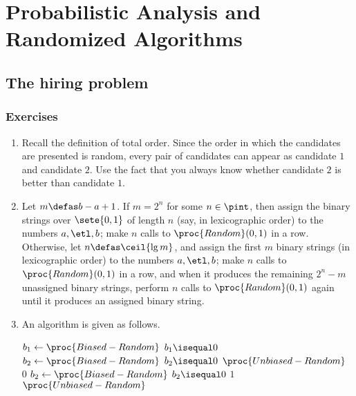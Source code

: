 \setcounter{chapter}{4}
\chapter{Probabilistic Analysis and Randomized Algorithms}
\section{The hiring problem}
\subsection*{Exercises}
\begin{enumerate}[\thesection-1]
%
\item Recall the definition of total order. Since the order in which the candidates are presented is random, every pair of candidates can appear as candidate $1$ and candidate $2$. Use the fact that you always know whether candidate $2$ is better than candidate $1$.
%
\item Let $m \defas b - a + 1$. If $m = 2^n$ for some $n \in \pint$, then assign the binary strings over $\sete{0, 1}$ of length $n$ (say, in lexicographic order) to the numbers $a, \etl, b$; make $n$ calls to $\proc{Random}(0, 1)$ in a row. Otherwise, let $n \defas \ceil{\lg m}$, and assign the first $m$ binary strings (in lexicographic order) to the numbers $a, \etl, b$; make $n$ calls to $\proc{Random}(0, 1)$ in a row, and when it produces the remaining $2^n - m$ unassigned binary strings, perform $n$ calls to $\proc{Random}(0, 1)$ again until it produces an assigned binary string.
%
\item An algorithm is given as follows.
\begin{codebox}
\li $b_1 \gets \proc{Biased-Random}$
\li \If $b_1 \isequal 0$
\li \Then
          $b_2 \gets \proc{Biased-Random}$
\li       \If $b_2 \isequal 0$
\li       \Then
                \Return $\proc{Unbiased-Random}$
\li       \Else
\li             \Return $0$
\zi             {}
          \End
\li \Else {}
\li       $b_2 \gets \proc{Biased-Random}$
\li       \If $b_2 \isequal 0$
\li       \Then
                \Return $1$
\zi             {}
\li       \Else
\li             \Return $\proc{Unbiased-Random}$
          \End
     \End
\end{codebox}
%
\end{enumerate}

